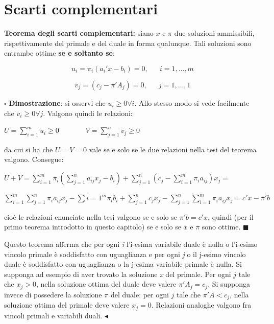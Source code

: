 \documentclass[11pt]{book}
\begin{document}
\section{Scarti complementari}

{\bf Teorema degli scarti complementari:} siano $x$ e $\pi$ due
soluzioni ammissibili, rispettivamente del primale e del duale in
forma qualunque. Tali soluzioni sono entrambe ottime {\bf se e
  soltanto se}:

\begin{equation}
  \label{c1}
  u_i = \pi_i(a_i'x-b_i) = 0, \phantom{aaa}i=1,\dots,m
\end{equation}

\begin{equation}
  \label{c2}
  v_j = (c_j-\pi'A_j) = 0, \phantom{aaa}j=1,\dots,1
\end{equation}

\vspace{11pt} $\square$ {\bf Dimostrazione}: si osservi che $u_i \geq
0 \forall i$. Allo stesso modo si vede facilmente che $v_i \geq 0
\forall j$. Valgono quindi le relazioni:

\begin{center}
$U = \sum\limits_{i=1}^m u_i \geq 0 \phantom{aaaaaaa}V =
  \sum\limits_{j=1}^n v_j \geq 0$  
\end{center}

da cui si ha che $U = V = 0$ vale se e solo se le due relazioni nella
tesi del teorema valgono. Consegue:


\begin{center}
$U + V = \sum\limits_{i=1}^m \pi_i (\sum\limits_{j=1}^n a_{ij}x_j -
  b_i) + \sum\limits_{j=1}^n (c_j - \sum\limits_{i=1}^m
  \pi_ia_{ij})x_j =$

$\sum\limits_{i=1}^m\sum\limits_{j=1}^n\pi_ia_{ij}x_j -
  \sum\limits{i=1}^m \pi_ib_i + \sum\limits_{j=1}^n c_jx_j -
  \sum\limits_{j=1}^n\sum\limits_{i=1}^m \pi_i a_{ij} x_j = c'x- \pi'b$
\end{center}

cio\`e le relazioni enunciate nella tesi valgono se e solo se $\pi'b =
c'x$, quindi (per il primo teorema introdotto in questo capitolo) se e
solo se $x$ e $\pi$ sono ottime.  $\blacksquare$
\vspace{11pt}

Questo teorema afferma che per ogni {\em i} l'i-esima variabile duale
\`e nulla o l'i-esimo vincolo primale \`e soddisfatto con uguaglianza
e per ogni {\em j} o il j-esimo vincolo duale \`e soddisfatto con
uguaglianza o la j-esima variabile primale \`e nulla. Si supponga ad
esempio di aver trovato la soluzione {\em x} del primale. Per ogni $j$
tale che $x_j > 0$, nella soluzione ottima del duale deve valere
$\pi'A_j = c_j$. Si supponga invece di possedere la soluzione $\pi$
del duale: per ogni $j$ tale che $\pi'A < c_j$, nella soluzione ottima
del primale deve valere $x_j = 0$. Relazioni analoghe valgono fra
vincoli primali e variabili duali. $\blacktriangleleft$
\vspace{11pt}
\end{document}
